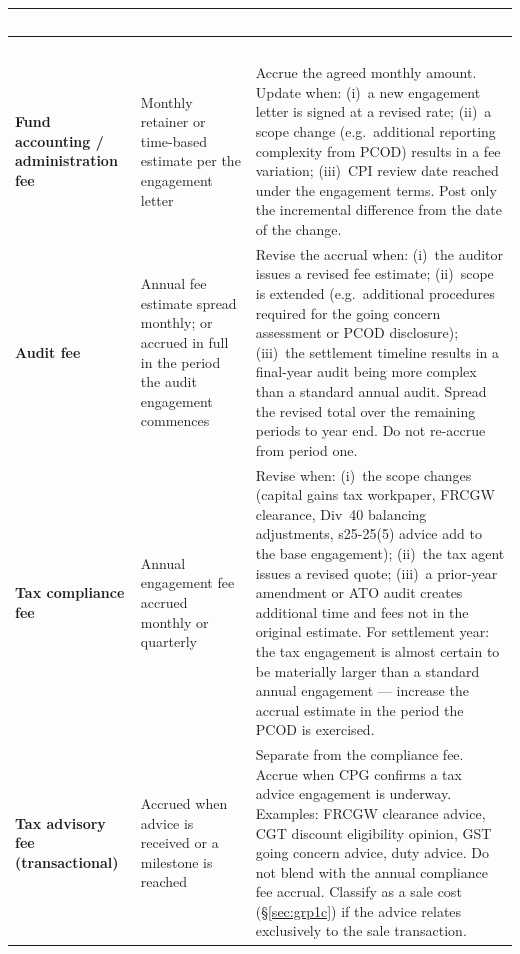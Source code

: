 \documentclass[10pt,a4paper]{article}
\begin{document}
{\small\sffamily
\begin{longtable}{@{} L{3.0cm} L{2.2cm} L{7.5cm} @{}}
\textcolor{white}{\bfseries Fee Type} & \textcolor{white}{\bfseries Accrual Basis} & \textcolor{white}{\bfseries Update Trigger \& Procedure} \\
\midrule
\endfirsthead
{}\textcolor{white}{\bfseries Fee Type} & \textcolor{white}{\bfseries Accrual Basis} & \textcolor{white}{\bfseries Update Trigger \& Procedure} \\
\midrule
\endhead
\textbf{Fund accounting / administration fee} & Monthly retainer or time-based estimate per the engagement letter & Accrue the agreed monthly amount. Update when: (i)~a new engagement letter is signed at a revised rate; (ii)~a scope change (e.g.\ additional reporting complexity from PCOD) results in a fee variation; (iii)~CPI review date reached under the engagement terms. Post only the incremental difference from the date of the change. \\
\textbf{Audit fee} & Annual fee estimate spread monthly; or accrued in full in the period the audit engagement commences & Revise the accrual when: (i)~the auditor issues a revised fee estimate; (ii)~scope is extended (e.g.\ additional procedures required for the going concern assessment or PCOD disclosure); (iii)~the settlement timeline results in a final-year audit being more complex than a standard annual audit. Spread the revised total over the remaining periods to year end. Do not re-accrue from period one. \\
\textbf{Tax compliance fee} & Annual engagement fee accrued monthly or quarterly & Revise when: (i)~the scope changes (capital gains tax workpaper, FRCGW clearance, Div~40 balancing adjustments, s25-25(5) advice add to the base engagement); (ii)~the tax agent issues a revised quote; (iii)~a prior-year amendment or ATO audit creates additional time and fees not in the original estimate. For settlement year: the tax engagement is almost certain to be materially larger than a standard annual engagement --- increase the accrual estimate in the period the PCOD is exercised. \\
\textbf{Tax advisory fee (transactional)} & Accrued when advice is received or a milestone is reached & Separate from the compliance fee. Accrue when CPG confirms a tax advice engagement is underway. Examples: FRCGW clearance advice, CGT discount eligibility opinion, GST going concern advice, duty advice. Do not blend with the annual compliance fee accrual. Classify as a sale cost (\S\ref{sec:grp1c}) if the advice relates exclusively to the sale transaction. \\
\bottomrule
\end{longtable}}
\end{document}
